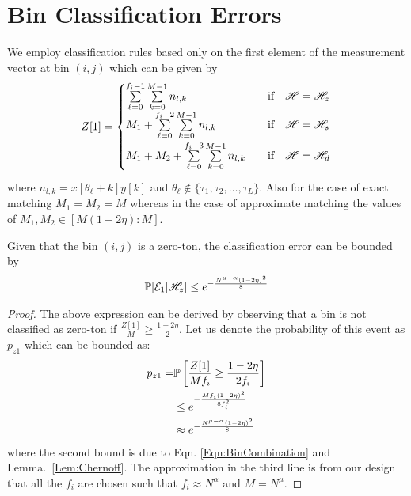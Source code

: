 \section{Bin Classification Errors}
\label{Append:BinClassif}
We employ classification rules based only on the first element of the measurement vector at bin $(i,j)$ which can be given by
\begin{align}
Z[1]=\begin{cases}
\sum\limits_{\ell=0}^{f_{i}-1}\sum\limits_{k=0}^{M-1} n_{l,k}  & ~~\text{ if } ~~ \msc{H}=\msc{H}_z\label{Eqn:BinCombination}\\
\vspace{\vgap}
M_1+\sum\limits_{\ell=0}^{f_{i}-2}\sum\limits_{k=0}^{M-1} n_{l,k}  & ~~\text{ if } ~~ \msc{H}=\msc{H}_s\\
\vspace{\vgap}
M_1+M_2+\sum\limits_{\ell=0}^{f_{i}-3}\sum\limits_{k=0}^{M-1} n_{l,k}  & ~~\text{ if } ~~ \msc{H}=\msc{H}_d\\
\end{cases}
\end{align}
where $n_{l,k}=x[\theta_{\ell}+k]y[k]$ and $\theta_{\ell}\notin\{\tau_1,\tau_2,\ldots,\tau_L\}$. Also for the case of exact matching $M_1=M_2=M$ whereas in the case of approximate matching the values of $M_1,M_2\in[M(1-2\eta):M]$.

\begin{lemma}
\label{Lem:ZerotonClassif}
Given that the bin $(i,j)$ is a zero-ton, the classification error can be bounded by
\begin{align*}
\mathbb{P}[\mathcal{E}_1|\mathscr{H}_z]\leq e^{-\frac{N^{\mu-\alpha}(1-2\eta)^2}{8}}
\end{align*}
\end{lemma}
\begin{proof}
The above expression can be derived by observing that a bin is not classified as zero-ton if $\frac{Z[1]}{M}\geq\frac{1-2\eta}{2}$. Let us denote the probability of this event as $p_{z1}$ which can be bounded as:
\begin{align*}
p_{z1}=&\mathbb{P}\left[\frac{Z[1]}{Mf_i}\geq\frac{1-2\eta}{2f_i}\right]\\
&\leq e^{-\frac{Mf_i(1-2\eta)^2}{8f_i^{2}}}\\
&\approx e^{-\frac{N^{\mu-\alpha}(1-2\eta)^2}{8}}
\end{align*} 
where the second bound is due to Eqn. \eqref{Eqn:BinCombination} and Lemma.~\ref{Lem:Chernoff}. The approximation in the third line is from our design that all the $f_i$ are chosen such that $f_i\approx N^{\alpha}$ and $M=N^{\mu}.$
\end{proof}

